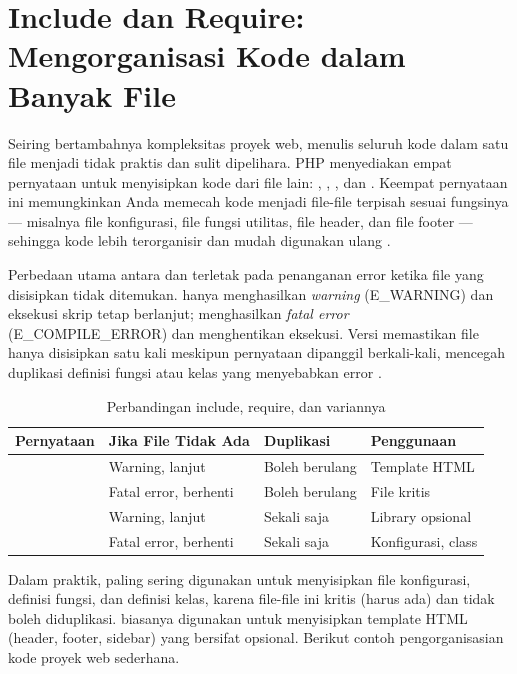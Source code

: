 \section{Include dan Require: Mengorganisasi Kode dalam Banyak File}

Seiring bertambahnya kompleksitas proyek web, menulis seluruh kode dalam satu file menjadi tidak praktis dan sulit dipelihara. PHP menyediakan empat pernyataan untuk menyisipkan kode dari file lain: , , , dan . Keempat pernyataan ini memungkinkan Anda memecah kode menjadi file-file terpisah sesuai fungsinya --- misalnya file konfigurasi, file fungsi utilitas, file header, dan file footer --- sehingga kode lebih terorganisir dan mudah digunakan ulang \cite{phpManual}.

Perbedaan utama antara  dan  terletak pada penanganan error ketika file yang disisipkan tidak ditemukan.  hanya menghasilkan \textit{warning} (E\_WARNING) dan eksekusi skrip tetap berlanjut;  menghasilkan \textit{fatal error} (E\_COMPILE\_ERROR) dan menghentikan eksekusi. Versi  memastikan file hanya disisipkan satu kali meskipun pernyataan dipanggil berkali-kali, mencegah duplikasi definisi fungsi atau kelas yang menyebabkan error \cite{phpRightWay}.

\begin{table}[ht]
\centering
\begin{tabular}{|P{3cm}|P{3.5cm}|P{3cm}|P{2.5cm}|}
\hline
\textbf{Pernyataan} & \textbf{Jika File Tidak Ada} & \textbf{Duplikasi} & \textbf{Penggunaan} \\
\hline
{} & Warning, lanjut & Boleh berulang & Template HTML \\
\hline
{} & Fatal error, berhenti & Boleh berulang & File kritis \\
\hline
{} & Warning, lanjut & Sekali saja & Library opsional \\
\hline
{} & Fatal error, berhenti & Sekali saja & Konfigurasi, class \\
\hline
\end{tabular}
\caption{Perbandingan include, require, dan variannya}
\end{table}

Dalam praktik,  paling sering digunakan untuk menyisipkan file konfigurasi, definisi fungsi, dan definisi kelas, karena file-file ini kritis (harus ada) dan tidak boleh diduplikasi.  biasanya digunakan untuk menyisipkan template HTML (header, footer, sidebar) yang bersifat opsional. Berikut contoh pengorganisasian kode proyek web sederhana.

